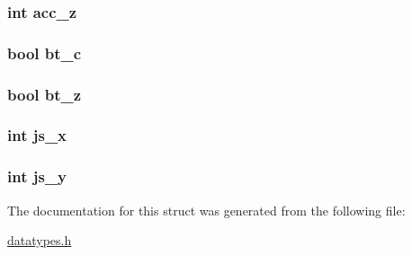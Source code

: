 \subsubsection[{acc\+\_\+z}]{\setlength{\rightskip}{0pt plus 5cm}int acc\+\_\+z}\label{structchuck__data_a839127c95042324c621c2460cc87d508}
\hypertarget{structchuck__data_acd68d783e852df0a016dcafb44402f86}{}
\subsubsection[{bt\+\_\+c}]{\setlength{\rightskip}{0pt plus 5cm}bool bt\+\_\+c}\label{structchuck__data_acd68d783e852df0a016dcafb44402f86}
\hypertarget{structchuck__data_a33ceb865cadc673b73d6c1ac14ab39e5}{}
\subsubsection[{bt\+\_\+z}]{\setlength{\rightskip}{0pt plus 5cm}bool bt\+\_\+z}\label{structchuck__data_a33ceb865cadc673b73d6c1ac14ab39e5}
\hypertarget{structchuck__data_a255b264700051e2ac0f9068b70da861f}{}
\subsubsection[{js\+\_\+x}]{\setlength{\rightskip}{0pt plus 5cm}int js\+\_\+x}\label{structchuck__data_a255b264700051e2ac0f9068b70da861f}
\hypertarget{structchuck__data_a7333b2e1634c12d6f5d169b7bfd6e023}{}
\subsubsection[{js\+\_\+y}]{\setlength{\rightskip}{0pt plus 5cm}int js\+\_\+y}\label{structchuck__data_a7333b2e1634c12d6f5d169b7bfd6e023}


The documentation for this struct was generated from the following file\+:\begin{DoxyCompactItemize}
\item 
\hyperlink{datatypes_8h}{datatypes.\+h}\end{DoxyCompactItemize}
